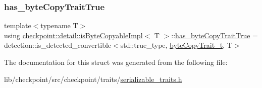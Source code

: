 \mbox{\label{structcheckpoint_1_1detail_1_1is_byte_copyable_impl_a2370db16994d2162a2806de74f322978}} 
\subsubsection{\texorpdfstring{has\+\_\+byte\+Copy\+Trait\+True}{has\_byteCopyTraitTrue}}
{\footnotesize\ttfamily template$<$typename T$>$ \\
using \hyperlink{structcheckpoint_1_1detail_1_1is_byte_copyable_impl}{checkpoint\+::detail\+::is\+Byte\+Copyable\+Impl}$<$ T $>$\+::\hyperlink{structcheckpoint_1_1detail_1_1is_byte_copyable_impl_a2370db16994d2162a2806de74f322978}{has\+\_\+byte\+Copy\+Trait\+True} =  detection\+::is\+\_\+detected\+\_\+convertible$<$std\+::true\+\_\+type, \hyperlink{structcheckpoint_1_1detail_1_1is_byte_copyable_impl_a5ac4b9b4645bc6cfb4e68877719de938}{byte\+Copy\+Trait\+\_\+t}, T$>$}



The documentation for this struct was generated from the following file\+:\begin{DoxyCompactItemize}
\item 
lib/checkpoint/src/checkpoint/traits/\hyperlink{serializable__traits_8h}{serializable\+\_\+traits.\+h}\end{DoxyCompactItemize}
